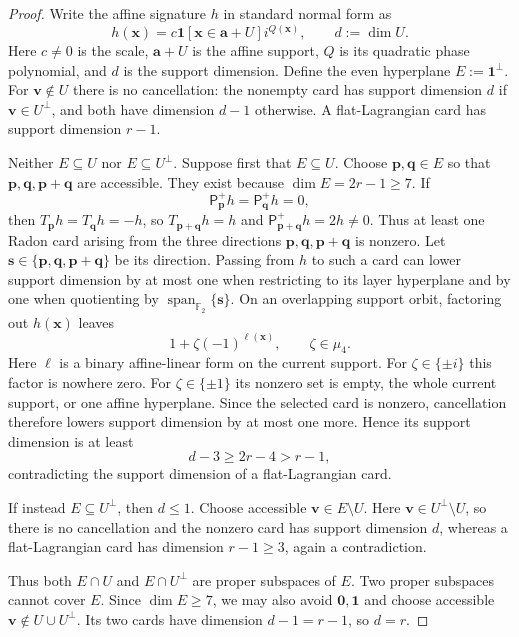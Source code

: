 \documentclass[11pt,letterpaper,onecolumn]{article}
\theoremstyle{plain}
\theoremstyle{definition}
\theoremstyle{remark}
\newcommand{\Ftwo}{\mathbb F_2}
\newcommand{\Span}{\operatorname{span}}
\newcommand{\one}{\mathbf 1}
\newcommand{\zero}{\mathbf 0}
\begin{document}
\begin{proof}
Write the affine signature \(h\) in standard normal form as
\[
  h({\mathbf{x}})=c\one[{\mathbf{x}}\in {\mathbf{a}}+U]i^{Q({\mathbf{x}})},
  \qquad d:=\dim U.
\]
Here \(c\ne0\) is the scale, \({\mathbf{a}}+U\) is the affine support, \(Q\) is its
quadratic phase polynomial, and \(d\) is the support dimension.  Define the even hyperplane
\(E:=\one^\perp\).  For \({\mathbf{v}}\notin U\) there is no cancellation:
the nonempty card has support dimension \(d\) if \({\mathbf{v}}\in U^\perp\), and
both have dimension \(d-1\) otherwise.  A flat-Lagrangian card has support dimension \(r-1\).

Neither \(E\subseteq U\) nor \(E\subseteq U^\perp\).  Suppose first that
\(E\subseteq U\).  Choose \({\mathbf{p}},{\mathbf{q}}\in E\) so that
\({\mathbf{p}},{\mathbf{q}},{\mathbf{p}}+{\mathbf{q}}\) are accessible.  They exist because \(\dim E=2r-1\ge7\).
If
\[
 \mathsf P_{\mathbf{p}}^+h=\mathsf P_{\mathbf{q}}^+h=0,
\]
then \(T_{\mathbf{p}}h=T_{\mathbf{q}}h=-h\), so \(T_{{\mathbf{p}}+{\mathbf{q}}}h=h\) and
\(\mathsf P_{{\mathbf{p}}+{\mathbf{q}}}^+h=2h\ne0\).  Thus at least one Radon card arising
from the three directions \({\mathbf{p}},{\mathbf{q}},{\mathbf{p}}+{\mathbf{q}}\) is nonzero.  Let
\({\mathbf{s}}\in\{{\mathbf{p}},{\mathbf{q}},{\mathbf{p}}+{\mathbf{q}}\}\) be its direction.  Passing from \(h\) to such a card
can lower support dimension by at most one when restricting to
its layer hyperplane and by one when quotienting by
\(\Span_{\Ftwo}\{{\mathbf{s}}\}\).
On an overlapping support orbit, factoring out \(h({\mathbf{x}})\) leaves
\[
 1+\zeta(-1)^{\ell({\mathbf{x}})},
 \qquad \zeta\in\mu_4.
\]
Here \(\ell\) is a binary affine-linear form on the current support.
For \(\zeta\in\{\pm i\}\) this factor is nowhere zero. For
\(\zeta\in\{\pm1\}\) its nonzero set is empty, the whole current support,
or one affine hyperplane.  Since the selected card is nonzero, cancellation
therefore lowers support dimension by at most one more.
Hence its support dimension is at least
\[
 d-3\ge2r-4>r-1,
\]
contradicting the support dimension of a flat-Lagrangian card.

If instead \(E\subseteq U^\perp\), then \(d\le1\).  Choose accessible
\({\mathbf{v}}\in E\setminus U\).  Here \({\mathbf{v}}\in U^\perp\setminus U\), so there is no
cancellation and the nonzero card has support dimension \(d\), whereas a
flat-Lagrangian card has dimension \(r-1\ge3\), again a contradiction.

Thus both \(E\cap U\) and \(E\cap U^\perp\) are proper subspaces of \(E\).
Two proper subspaces cannot cover \(E\). Since \(\dim E\ge7\), we may also
avoid \(\zero,\one\) and choose accessible
\({\mathbf{v}}\notin U\cup U^\perp\).  Its two cards have dimension
\(d-1=r-1\), so \(d=r\).


\end{proof}
\end{document}
